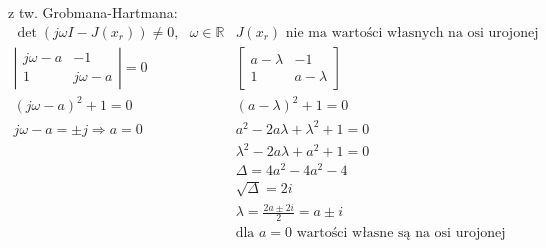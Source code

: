z tw. Grobmana-Hartmana:\\
$\begin{array}{ll}
\det(j\omega I-J(x_r)) \neq 0, \ \ \ \omega \in \mathbb{R} & J(x_r)\text{ nie ma wartości własnych na osi urojonej}\\
 \left| \begin{array}{cc}     j\omega-a& -1 \\ 1 & j\omega-a    \end{array}\right|=0 &  \left[ \begin{array}{cc}    a-\lambda & -1 \\ 1 & a- \lambda   \end{array}\right]\\
(j\omega-a)^2+1=0 & (a-\lambda)^2+1=0\\
j\omega-a= \pm j \Rightarrow \boxed{ a=0} & a^2-2a\lambda +\lambda^2+1 =0\\
&\lambda^2-2a\lambda+a^2+1 = 0\\
&\Delta=4a^2-4a^2-4\\
&\sqrt{\Delta}=2i\\
&\lambda=\frac{2a \pm 2i}{2} = a \pm i\\
&\text{dla } a=0 \text{ wartości własne są na osi urojonej}
\end{array}$\\


\pagebreak
